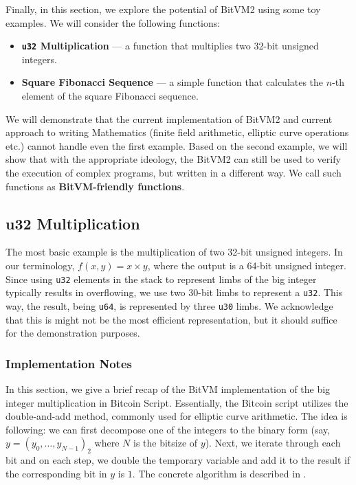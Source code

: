 \documentclass{iacrtrans}
\begin{document}
Finally, in this section, we explore the potential of BitVM2 using
some toy examples. We will consider the following functions:
\begin{itemize}
  \item \textbf{\texttt{u32} Multiplication} --- a function that
    multiplies two 32-bit unsigned integers.
  \item \textbf{Square Fibonacci Sequence} --- a simple function that
    calculates the $n$-th element of the square Fibonacci sequence.
\end{itemize}

We will demonstrate that the current implementation of BitVM2 and current
approach to writing Mathematics (finite field arithmetic, elliptic curve operations etc.) 
cannot handle even the first example. Based on the second example, we will show 
that with the appropriate ideology, the BitVM2 can still be used to verify the execution of
complex programs, but written in a different way. We call such functions as
\textbf{BitVM-friendly functions}.
\subsection{u32 Multiplication}

The most basic example is the multiplication of two 32-bit unsigned integers. In our terminology, $f(x,y) = x \times y$, where the output is a 64-bit unsigned integer. Since using \texttt{u32} elements in the stack to represent limbs of the big integer typically results in overflowing, we use two $30$-bit limbs to represent a \texttt{u32}. This way, the result, being \texttt{u64}, is represented by three \texttt{u30} limbs. We acknowledge that this is might not be the most efficient representation, but it should suffice for the demonstration purposes.

\subsubsection{Implementation Notes}

In this section, we give a brief recap of the BitVM implementation of the big integer multiplication in Bitcoin Script. Essentially, the Bitcoin script utilizes the double-and-add method, commonly used for elliptic curve arithmetic. The idea is following: we can first decompose one of the integers to the binary form (say, $y=(y_0,\dots,y_{N-1})_2$ where $N$ is the bitsize of $y$). Next, we iterate through each bit and on each step, we double the temporary variable and add it to the result if the corresponding bit in $y$ is $1$. The concrete algorithm is described in .
\end{document}
